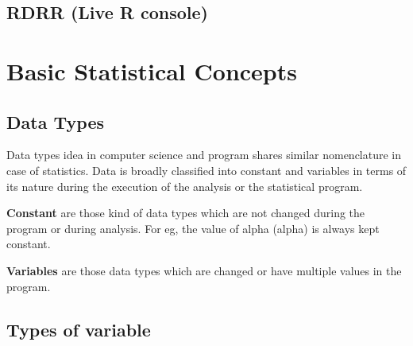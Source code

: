 \documentclass[
]{book}
\begin{document}
\hypertarget{rdrr-live-r-console}{%
\section{RDRR (Live R console)}\label{rdrr-live-r-console}}

\hypertarget{basic-statistical-concepts}{%
\chapter{Basic Statistical Concepts}\label{basic-statistical-concepts}}

\hypertarget{data-types}{%
\section{Data Types}\label{data-types}}

Data types idea in computer science and program shares similar nomenclature in case of statistics. Data is broadly classified into constant and variables in terms of its nature during the execution of the analysis or the statistical program.

\textbf{Constant} are those kind of data types which are not changed during the program or during analysis. For eg, the value of alpha (alpha) is always kept constant.

\textbf{Variables} are those data types which are changed or have multiple values in the program.

\hypertarget{types-of-variable}{%
\section{Types of variable}\label{types-of-variable}}
\end{document}
